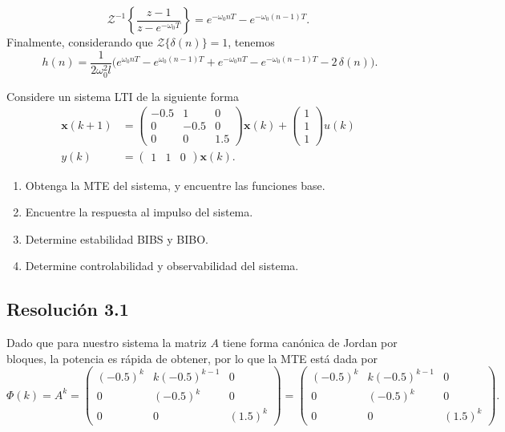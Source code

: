 \documentclass[
  11pt,
  letterpaper,
   addpoints,
  answers
  ]{exam}
\begin{document}
\begin{questions}
\begin{solution}
\begin{equation}
\mathcal{Z}^{-1}\!\left\{\frac{z-1}{z-e^{-\omega_0 T}}\right\}
=e^{-\omega_0 nT}-e^{-\omega_0 (n-1)T}.
\end{equation}
Finalmente, considerando que $\mathcal{Z}\{\delta(n)\}=1$, tenemos
\begin{equation}
\boxed{\;
h(n)=\frac{1}{2\omega_0^{2} l}
\Big(
e^{\omega_0 nT}-e^{\omega_0 (n-1)T}
+e^{-\omega_0 nT}-e^{-\omega_0 (n-1)T}
-2\,\delta(n)
\Big).}
\end{equation}
\end{solution}
\question Considere un sistema LTI de la siguiente forma
\begin{align*}
\mathbf{x}(k+1) &= \begin{pmatrix} -0.5 & 1 & 0 \\ 0 & -0.5 & 0 \\ 0 & 0 & 1.5 \end{pmatrix} \mathbf{x}(k) + \begin{pmatrix} 1 \\ 1 \\ 1 \end{pmatrix} u(k) \\
y(k) &= \begin{pmatrix} 1 & 1 & 0 \end{pmatrix} \mathbf{x}(k).
\end{align*}

\begin{enumerate}
  \item Obtenga la MTE del sistema, y encuentre las funciones base.
  \item Encuentre la respuesta al impulso del sistema.
  \item Determine estabilidad BIBS y BIBO.
  \item Determine controlabilidad y observabilidad del sistema.
\end{enumerate}
\begin{solution}

\subsection*{Resolución 3.1}

Dado que para nuestro sistema la matriz $A$ tiene forma canónica de Jordan por bloques, la
potencia es rápida de obtener, por lo que la MTE está dada por
\begin{equation}
\Phi(k)=A^{k}=
\begin{pmatrix}
(-0.5)^{k} & k(-0.5)^{k-1} & 0\\
0          & (-0.5)^{k}    & 0\\
0          & 0              & (1.5)^{k}
\end{pmatrix}
=
\begin{pmatrix}
(-0.5)^{k} & k(-0.5)^{k-1} & 0\\
0          & (-0.5)^{k}    & 0\\
0          & 0              & (1.5)^{k}
\end{pmatrix}.
\tag{3}
\end{equation}


\end{solution}
\end{questions}
\end{document}
